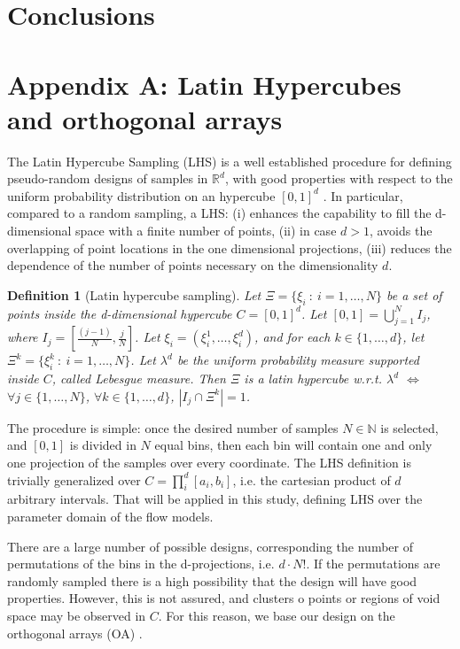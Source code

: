 \documentclass{article}
\newtheorem{definition}[theorem]{Definition}
\begin{document}
   

\section{Conclusions}

\section{Appendix A: Latin Hypercubes and orthogonal arrays}\label{Appendix}
The Latin Hypercube Sampling (LHS) is a well established procedure for defining pseudo-random designs of samples in $\mathbb R^d$, with good properties with respect to the uniform probability distribution on an hypercube $[0,1]^d$ \citep{McKay1979,Owen1992b,Stein1987,Ranjan2014,Mingyao2016}. In particular, compared to a random sampling, a LHS: (i) enhances the capability to fill the d-dimensional space with a finite number of points, (ii) in case $d>1$, avoids the overlapping of point locations in the one dimensional projections, (iii) reduces the dependence of the number of points necessary on the dimensionality $d$.

\begin{definition}[Latin hypercube sampling]
Let $\Xi=\{\xi_i\ :\ i=1,\dots,N\}$ be a set of points inside the d-dimensional hypercube $C=[0,1]^d$. Let $[0,1]=\bigcup_{j=1}^{N} I_j$, where $I_j=[\frac{(j-1)}{N},\frac{j}{N}]$. Let $\xi_i=\left(\xi_i^1,\dots,\xi_i^d\right)$, and for each $k\in\{1,\dots,d\}$, let $\Xi^k=\{\xi^k_i\ :\ i=1,\dots,N\}$. Let $\lambda^d$ be the uniform probability measure supported inside $C$, called Lebesgue measure. Then $\Xi$ is a latin hypercube w.r.t. $\lambda^d$ $\Longleftrightarrow$ $\forall j\in \{1,\dots,N\}$, $\forall k\in\{1,\dots,d\}$, $\left|I_j\cap\Xi^k\right|=1$.
\end{definition}

The procedure is simple: once the desired number of samples $N\in\mathbb N$ is selected, and $[0,1]$ is divided in $N$ equal bins, then each bin will contain one and only one projection of the samples over every coordinate. The LHS definition is trivially generalized over $C=\prod^d_i [a_i, b_i]$, i.e. the cartesian product of $d$ arbitrary intervals. That will be applied in this study, defining LHS over the parameter domain of the flow models.

There are a large number of possible designs, corresponding the number of permutations of the bins in the d-projections, i.e. $d\cdot N!$. If the permutations are randomly sampled there is a high possibility that the design will have good properties. However, this is not assured, and clusters o points or regions of void space may be observed in $C$. For this reason, we base our design on the orthogonal arrays (OA) \citep{Owen1992a,Tang1993}.
\end{document}
